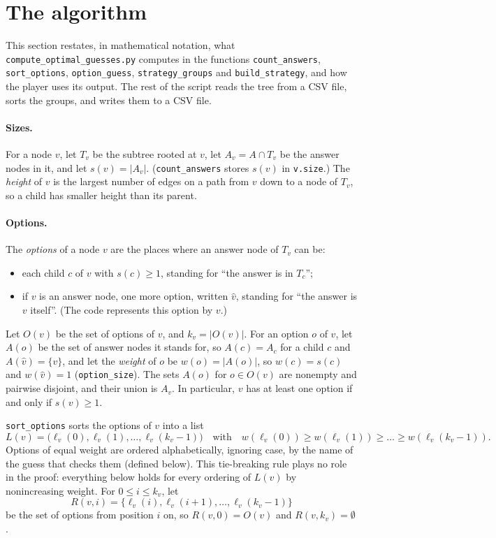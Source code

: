 \documentclass[11pt]{article}
\newcommand{\code}[1]{\texttt{#1}}
\begin{document}
\section{The algorithm}
\label{sec:algorithm}

This section restates, in mathematical notation, what
\code{compute\_optimal\_guesses.py} computes in the functions
\code{count\_answers}, \code{sort\_options}, \code{option\_guess},
\code{strategy\_groups} and \code{build\_strategy}, and how the player uses its
output. The rest of the script reads the tree from a CSV file, sorts the groups,
and writes them to a CSV file.

\paragraph{Sizes.}
For a node $v$, let $T_v$ be the subtree rooted at $v$, let $A_v = A \cap T_v$ be
the answer nodes in it, and let $s(v) = |A_v|$. (\code{count\_answers} stores
$s(v)$ in \code{v.size}.) The \emph{height} of $v$ is the largest number of edges
on a path from $v$ down to a node of $T_v$, so a child has smaller height than its
parent.

\paragraph{Options.}
The \emph{options} of a node $v$ are the places where an answer node of $T_v$ can
be:
\begin{itemize}
  \item each child $c$ of $v$ with $s(c) \ge 1$, standing for ``the answer is in
    $T_c$'';
  \item if $v$ is an answer node, one more option, written $\hat v$, standing for
    ``the answer is $v$ itself''. (The code represents this option by $v$.)
\end{itemize}
Let $O(v)$ be the set of options of $v$, and $k_v = |O(v)|$. For an option $o$ of
$v$, let $A(o)$ be the set of answer nodes it stands for, so $A(c) = A_c$ for a
child $c$ and $A(\hat v) = \{v\}$, and let the \emph{weight} of $o$ be
$w(o) = |A(o)|$, so $w(c) = s(c)$ and $w(\hat v) = 1$ (\code{option\_size}). The
sets $A(o)$ for $o \in O(v)$ are nonempty and pairwise disjoint, and their union
is $A_v$. In particular, $v$ has at least one option if and only if $s(v) \ge 1$.

\code{sort\_options} sorts the options of $v$ into a list
\[
  L(v) = \bigl(\ell_v(0), \ell_v(1), \dots, \ell_v(k_v - 1)\bigr)
  \quad\text{with}\quad
  w(\ell_v(0)) \ge w(\ell_v(1)) \ge \dots \ge w(\ell_v(k_v - 1)).
\]
Options of equal weight are ordered alphabetically, ignoring case, by the name of
the guess that checks them (defined below). This tie-breaking rule plays no role
in the proof: everything below holds for every ordering of $L(v)$ by nonincreasing
weight. For $0 \le i \le k_v$, let
\[
  R(v, i) = \{\ell_v(i), \ell_v(i+1), \dots, \ell_v(k_v - 1)\}
\]
be the set of options from position $i$ on, so $R(v, 0) = O(v)$ and
$R(v, k_v) = \emptyset$.
\end{document}

